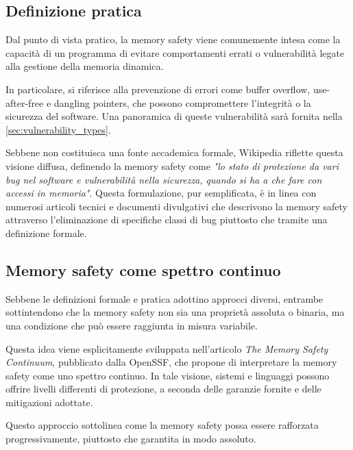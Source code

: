\subsection{Definizione pratica}
\label{sec:practical_definition}

Dal punto di vista pratico, la memory safety viene comunemente intesa come la capacità
di un programma di evitare comportamenti errati o vulnerabilità legate alla gestione
della memoria dinamica.

In particolare, si riferisce alla prevenzione di errori come buffer overflow, use-after-free
e dangling pointers, che possono compromettere l'integrità o la sicurezza del
software. Una panoramica di queste vulnerabilità sarà fornita nella \autoref{sec:vulnerability_types}.

Sebbene non costituisca una fonte accademica formale, Wikipedia\cite{wikipedia_definition}
riflette questa visione diffusa, definendo la memory safety come \textit{"lo stato
di protezione da vari bug nel software e vulnerabilità nella sicurezza, quando
si ha a che fare con accessi in memoria"}. Questa formulazione, pur semplificata,
è in linea con numerosi articoli tecnici e documenti divulgativi che descrivono
la memory safety attraverso l'eliminazione di specifiche classi di bug piuttosto
che tramite una definizione formale.

\subsection{Memory safety come spettro continuo}
\label{sec:continuum_definition}

Sebbene le definizioni formale e pratica adottino approcci diversi, entrambe
sottintendono che la memory safety non sia una proprietà assoluta o binaria, ma una
condizione che può essere raggiunta in misura variabile.

Questa idea viene esplicitamente sviluppata nell'articolo \textit{The Memory
Safety Continuum}\cite{memory_safety_continuum}, pubblicato dalla OpenSSF, che propone
di interpretare la memory safety come uno spettro continuo. In tale visione, sistemi
e linguaggi possono offrire livelli differenti di protezione, a seconda delle
garanzie fornite e delle mitigazioni adottate.

Questo approccio sottolinea come la memory safety possa essere rafforzata
progressivamente, piuttosto che garantita in modo assoluto.